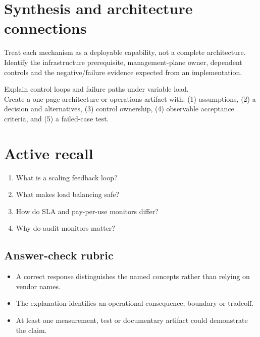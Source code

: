 \documentclass[10pt,letterpaper]{article}
\begin{document}
\section{Synthesis and architecture connections}
Treat each mechanism as a deployable capability, not a complete architecture. Identify the infrastructure prerequisite, management-plane owner, dependent controls and the negative/failure evidence expected from an implementation.
\begin{workbox}[title={Applied deliverable}]
Explain control loops and failure paths under variable load.\\[4pt]Create a one-page architecture or operations artifact with: (1) assumptions, (2) a decision and alternatives, (3) control ownership, (4) observable acceptance criteria, and (5) a failed-case test.
\end{workbox}
\section{Active recall}
\begin{enumerate}
\item What is a scaling feedback loop?
\item What makes load balancing safe?
\item How do SLA and pay-per-use monitors differ?
\item Why do audit monitors matter?
\end{enumerate}
\subsection{Answer-check rubric}
\begin{itemize}
\item A correct response distinguishes the named concepts rather than relying on vendor names.
\item The explanation identifies an operational consequence, boundary or tradeoff.
\item At least one measurement, test or documentary artifact could demonstrate the claim.
\end{itemize}
\end{document}
